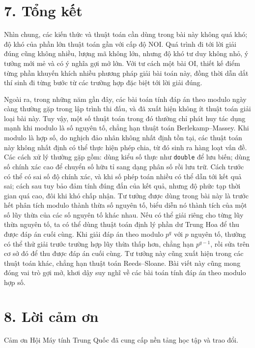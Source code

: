 \documentclass[11pt]{article}
\begin{document}
\section*{7. Tổng kết}

Nhìn chung, các kiến thức và thuật toán cần dùng trong bài này không quá khó;
độ khó của phần lớn thuật toán gần với cấp độ NOI. Quá trình đi tới lời giải
đúng cũng không nhiều, lượng mã không lớn, nhưng độ khó tư duy không nhỏ, ý
tưởng mới mẻ và có ý nghĩa gợi mở lớn. Với tư cách một bài OI, thiết kế điểm
từng phần khuyến khích nhiều phương pháp giải bài toán này, đồng thời dẫn dắt
thí sinh đi từng bước từ các trường hợp đặc biệt tới lời giải đúng.

Ngoài ra, trong những năm gần đây, các bài toán tính đáp án theo modulo ngày
càng thường gặp trong lập trình thi đấu, và đã xuất hiện không ít thuật toán
giải loại bài này. Tuy vậy, một số thuật toán trong đó thường chỉ phát huy tác
dụng mạnh khi modulo là số nguyên tố, chẳng hạn thuật toán Berlekamp--Massey.
Khi modulo là hợp số, do nghịch đảo nhân không nhất định tồn tại, các thuật
toán này không nhất định có thể thực hiện phép chia, từ đó sinh ra hàng loạt
vấn đề. Các cách xử lý thường gặp gồm: dùng kiểu số thực như \texttt{double}
để lưu biến; dùng số chính xác cao để chuyển số hữu tỉ sang dạng phân số rồi
lưu trữ. Cách trước có thể có sai số độ chính xác, và khi số phép toán nhiều
có thể dẫn tới kết quả sai; cách sau tuy bảo đảm tính đúng đắn của kết quả,
nhưng độ phức tạp thời gian quá cao, đôi khi khó chấp nhận. Tư tưởng được
dùng trong bài này là trước hết phân tích modulo thành thừa số nguyên tố, biểu
diễn nó thành tích của một số lũy thừa của các số nguyên tố khác nhau. Nếu có
thể giải riêng cho từng lũy thừa nguyên tố, ta có thể dùng thuật toán định lý
phần dư Trung Hoa để thu được đáp án cuối cùng. Khi giải đáp án theo modulo
\(p^q\) với \(p\) nguyên tố, thường có thể thử giải trước trường hợp lũy thừa
thấp hơn, chẳng hạn \(p^{q-1}\), rồi sửa trên cơ sở đó để thu được đáp án cuối
cùng. Tư tưởng này cũng xuất hiện trong các thuật toán khác, chẳng hạn thuật
toán Reeds--Sloane. Bài viết này cũng mong đóng vai trò gợi mở, khơi dậy suy
nghĩ về các bài toán tính đáp án theo modulo hợp số.

\section*{8. Lời cảm ơn}

Cảm ơn Hội Máy tính Trung Quốc đã cung cấp nền tảng học tập và trao đổi.
\end{document}
